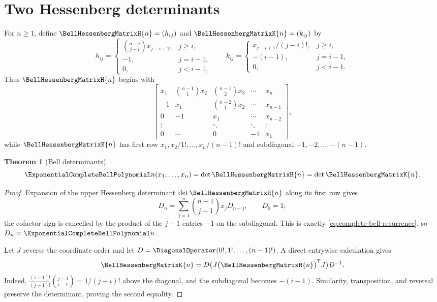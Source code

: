 \documentclass[11pt,a4paper,oneside,openany]{book}
\newtheorem{theorem}{Theorem}[chapter]
\theoremstyle{definition}
\theoremstyle{remark}
\begin{document}
\section{Two Hessenberg determinants}
For $n\ge1$, define $\BellHessenbergMatrixH{n}=(h_{ij})$ and $\BellHessenbergMatrixK{n}=(k_{ij})$ by
\[
 h_{ij}=\begin{cases}
 \binom{n-i}{j-i}x_{j-i+1},&j\ge i,\\
 -1,&j=i-1,\\0,&j<i-1,
 \end{cases}
 \qquad
 k_{ij}=\begin{cases}
 x_{j-i+1}/(j-i)!,&j\ge i,\\
 -(i-1),&j=i-1,\\0,&j<i-1.
 \end{cases}
\]
Thus $\BellHessenbergMatrixH{n}$ begins with
\[
\begin{bmatrix}
 x_1&\binom{n-1}{1}x_2&\binom{n-1}{2}x_3&\cdots&x_n\\
 -1&x_1&\binom{n-2}{1}x_2&\cdots&x_{n-1}\\
 0&-1&x_1&\cdots&x_{n-2}\\
 \vdots&&\ddots&\ddots&\vdots\\
 0&\cdots&0&-1&x_1
\end{bmatrix},
\]
while $\BellHessenbergMatrixK{n}$ has first row
$x_1,x_2/1!,\ldots,x_n/(n-1)!$ and subdiagonal
$-1,-2,\ldots,-(n-1)$.

\begin{theorem}[Bell determinants]\label{thm:bell-determinants}
\begin{equation}\label{eq:bell-determinants}
 \ExponentialCompleteBellPolynomial n(x_1,\ldots,x_n)=\det \BellHessenbergMatrixH{n}=\det \BellHessenbergMatrixK{n}.
\end{equation}
\end{theorem}
\begin{proof}
Expansion of the upper Hessenberg determinant $\det \BellHessenbergMatrixH{n}$ along its first row gives
\[
 D_n=\sum_{j=1}^{n}\binom{n-1}{j-1}x_jD_{n-j},\qquad D_0=1;
\]
the cofactor sign is cancelled by the product of the $j-1$ entries $-1$ on the
subdiagonal.  This is exactly \eqref{eq:complete-bell-recurrence}, so
$D_n=\ExponentialCompleteBellPolynomial n$.

Let $J$ reverse the coordinate order and let
$D=\DiagonalOperator(0!,1!,\ldots,(n-1)!)$.  A direct entrywise calculation gives
\[
 \BellHessenbergMatrixK{n}=D\bigl(J\bigl(\BellHessenbergMatrixH{n}\bigr)^{\mathsf T}J\bigr)D^{-1}.
\]
Indeed,
$\frac{(i-1)!}{(j-1)!}\binom{j-1}{i-1}=1/(j-i)!$ above the diagonal, and the
subdiagonal becomes $-(i-1)$.  Similarity, transposition, and reversal preserve
the determinant, proving the second equality.
\end{proof}
\end{document}
